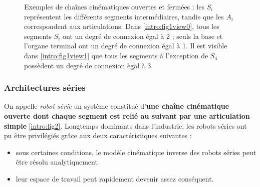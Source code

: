 \begin{figure}[!ht]
  \centering
       \hfill
    \caption{\footnotesize{Exemples de cha\^ines cin\'ematiques ouvertes et ferm\'ees : les $S_i$ repr\'esentent les diff\'erents segments interm\'ediaires, tandis que les $A_i$ correspondent aux articulations. Dans \ref{intro:fig1view0}, tous les segments $S_i$ ont un degr\'e de connexion \'egal \`a 2 ; seuls la base et l'organe terminal ont un degr\'e de connexion \'egal \`a 1. Il est visible dans \ref{intro:fig1view1} que tous les segments \`a l'exception de $S_4$ poss\`edent un degr\'e de connexion \`egal \`a 3.}}
\label{intro:fig1}
\end{figure}

\subsubsection{Architectures s\'eries}

On appelle {\it robot série} un système constitué d'{\bf une chaîne cinématique ouverte dont chaque segment est relié au suivant par une articulation simple} \ref{intro:fig2}. Longtemps dominants dans l'industrie, les robots séries ont pu être privilégiés grâce aux deux caractéristiques suivantes :
\begin{itemize}
 \item sous certaines conditions, le modèle cinématique inverse des robots séries peut être résolu analytiquement \cite{pieper1968kinematics}
 \item leur espace de travail peut rapidement devenir assez conséquent.
\end{itemize}

